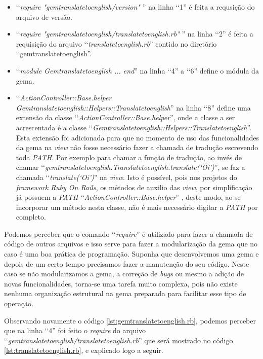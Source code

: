 \begin{itemize}

 \item ‘‘\emph{require "gemtranslatetoenglish/version"} '' na linha ‘‘1'' é feita a requsição do arquivo de
 versão.

 \item ‘‘\emph{require "gemtranslatetoenglish/translatetoenglish.rb"} '' na linha ‘‘2'' é feita a requisição
 do arquivo ‘‘\emph{translatetoenglish.rb}'' contido no diretório ‘‘gemtranslatetoenglish''.

 \item ‘‘\emph{module Gemtranslatetoenglish ... end}'' na linha ‘‘4'' a ‘‘6'' define o módula da gema.

 \item ‘‘\emph{ActionController::Base.helper Gemtranslatetoenglish::Helpers::Translatetoenglish}'' na linha
 ‘‘8'' define uma extensão da classe ‘‘\emph{ActionController::Base.helper}'', onde a classe a ser
 acrescentada é a classe ‘‘\emph{Gemtranslatetoenglish::Helpers::Translatetoenglish}''. Esta extensão foi
 adicionada para que no momento de uso das funcionalidades da gema na \emph{view} não fosse necessário
 fazer a chamada de tradução  escrevendo toda \emph{PATH}. Por exemplo para chamar a função de tradução,
 ao invés de chamar ‘‘\emph{gemtranslatetoenglish.Translatetoenglish.translate(‘Oi’)}'', se faz a chamada
 ‘‘\emph{translate(‘Oi’)}'' na \emph{view}. Isto é possível, pois nos projetos do
 \emph{framework Ruby On Rails}, os métodos de auxilio das \emph{view}, por simplificação já possuem a
 \emph{PATH} ‘‘\emph{ActionController::Base.helper}'' , deste modo, ao se incorporar um método nesta classe,
 não é mais necessário digitar a \emph{PATH} por completo.

\end{itemize}

Podemos perceber que o comando ‘‘\emph{require}'' é utilizado para fazer a chamada de código de outros
arquivos e isso serve para fazer a modularização da gema que no caso é uma boa prática de programação.
Suponha que desenvolvemos uma gema e depois de um certo tempo precisamos fazer a manutenção do
seu código. Neste caso se não modularizamos a gema, a correção de \emph{bugs} ou mesmo a adição de
novas funcionalidades, torna-se uma tarefa muito complexa, pois não existe nenhuma organização
estrutural na gema preparada para facilitar esse tipo de operação.

Observando novamente o código \ref{lst:gemtranslatetoenglish.rb}, podemos perceber que na linha ‘‘4''
foi feito o \emph{require} do arquivo ‘‘\emph{gemtranslatetoenglish/translatetoenglish.rb}'' que
será mostrado no código \ref{lst:translatetoenglish.rb}, e explicado logo a seguir.

